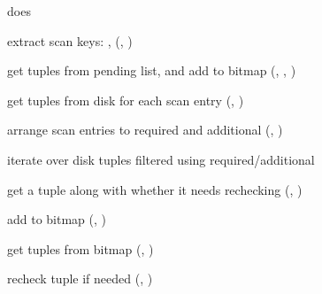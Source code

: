  does

\begin{nparts}
\item
  extract scan keys: , 
  (, )
\item
  get tuples from pending list, and add to bitmap (,
  , )
\item
  get tuples from disk for each scan entry (,
  )
\item
  arrange scan entries to required and additional (,
  )
\item
  iterate over disk tuples filtered using required/additional
  \begin{iparts}
  \item
    get a tuple along with whether it needs rechecking (,
    )
  \item
    add to bitmap (,
    )
  \end{iparts}
\item
  get tuples from bitmap (,
  )
\item
  recheck tuple if needed (,
  )
\end{nparts}
